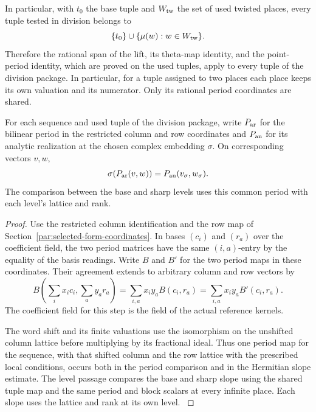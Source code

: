 In particular, with \(t_0\) the base tuple and \(W_{\rm tw}\) the set of used twisted places, every tuple tested in division belongs to
\[
  \{t_0\}\cup\{\mu(w):w\in W_{\rm tw}\}.
\]
 Therefore the rational span of the lift,
its theta-map identity, and the point-period identity,
which are proved on the used tuples, apply to every
tuple of the division package. In particular, for
a tuple assigned to two places each place keeps its
own valuation and its numerator. Only its rational
period coordinates are shared.

\begin{lemma}\label{lem:common-division-period}
For each sequence and used tuple of the division package, write \(P_{\rm ar}\) for the bilinear period in the restricted column and row coordinates and \(P_{\rm an}\) for its analytic realization at the chosen complex embedding \(\sigma\). On corresponding vectors \(v,w\),
\[
 \sigma(P_{\rm ar}(v,w))=P_{\rm an}(v_\sigma,w_\sigma).
\]
 The comparison between the base and
sharp levels uses this common period with each level's lattice
and rank.
\end{lemma}

\begin{proof}
Use the restricted column identification and the row map of
Section~\ref{par:selected-form-coordinates}. In bases \((c_i)\)
and \((r_a)\) over the coefficient field, the two period
matrices have the same \((i,a)\)-entry by the equality of the
basis readings. Write \(B\) and \(B'\) for the two period maps in these coordinates. Their agreement extends to arbitrary column and row vectors by
\[
  B\!\left(\sum_i x_i c_i,\sum_a y_a r_a\right)=\sum_{i,a}x_i y_a B(c_i,r_a)=\sum_{i,a}x_i y_a B'(c_i,r_a).
\]
 The coefficient field for this
step is the field of the actual reference kernels.

The word shift and its finite valuations use the
isomorphism on the unshifted column lattice before
multiplying by its fractional ideal. Thus one period map for the sequence,
with that shifted column and the row lattice with the prescribed local conditions,
occurs both in the period comparison and in the
Hermitian slope estimate. The level passage compares the
base and sharp slope using the shared tuple map and the
same period and block scalars at every infinite place.
Each slope uses the lattice and rank at its own level.
\label{cor:division-level-pins-2}

\end{proof}

